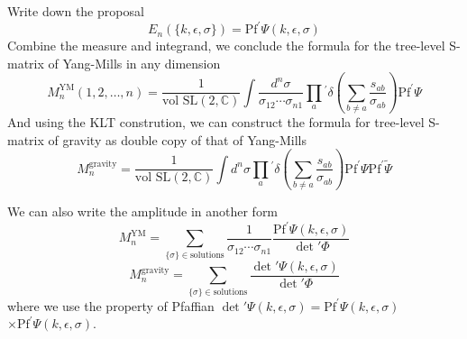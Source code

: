 \documentclass{beamer}
\begin{document}
\begin{frame}
    Write down the proposal
    \alert{
    \begin{equation*}
        E_n(\{k,\epsilon,\sigma\})=\mathrm{Pf}^\prime \Psi(k,\epsilon,\sigma)
    \end{equation*}}
    Combine the measure and integrand, we conclude the formula for the tree-level S-matrix of Yang-Mills in any dimension
    \begin{equation*}
        M_n^{\mathrm{YM}}(1,2,\dots,n)=\frac{1}{\text{vol SL}(2,\mathbb{C})}\int\frac{d^n\sigma}{\sigma_{12}\cdots\sigma_{n1}}\prod_{a}{}^{\prime}\delta{\left(\sum_{b\neq a}\frac{s_{ab}}{\sigma_{ab}}\right)}\mathrm{Pf}^{\prime}\Psi
    \end{equation*}
    And using the KLT constrution, we can construct the formula for tree-level S-matrix of gravity as double copy of that of Yang-Mills
    \begin{equation*}
        M_n^{\mathrm{gravity}}=\frac{1}{\text{vol SL}(2,\mathbb{C})}\int d^n\sigma\prod_{a}{}^{\prime}\delta{\left(\sum_{b\neq a}\frac{s_{ab}}{\sigma_{ab}}\right)}\mathrm{Pf}^{\prime}\Psi\mathrm{Pf}^{\prime}\tilde{\Psi}
    \end{equation*}
\end{frame}
\begin{frame}
    We can also write the amplitude in another form
    \begin{equation*}
        M_n^{\mathrm{YM}}=\sum_{\{\sigma\}\in\mathrm{solutions}}\frac{1}{\sigma_{12}\cdots\sigma_{n1}}\frac{\mathrm{Pf}^\prime \Psi(k,\epsilon,\sigma)}{\det{'}\Phi}
    \end{equation*}
    \begin{equation*}
        M_n^{\mathrm{gravity}}=\sum_{\{\sigma\}\in\mathrm{solutions}}\frac{\det{'}\Psi(k,\epsilon,\sigma)}{\det{'}\Phi}
    \end{equation*}
    where we use the property of Pfaffian $\det{'}\Psi(k,\epsilon,\sigma)=\mathrm{Pf}^\prime \Psi(k,\epsilon,\sigma)$\\$\times \mathrm{Pf}^\prime \Psi(k,\epsilon,\sigma)$.
\end{frame}
\end{document}
